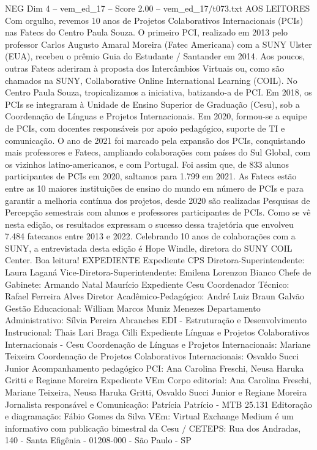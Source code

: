 \begin{textsample}{NEG Dim 4 – vem\_ed\_17 – Score 2.00 – vem\_ed\_17/t073.txt}  \label{ex:f4_neg_080}
AOS LEITORES Com orgulho, revemos 10 anos de Projetos Colaborativos Internacionais (PCIs) nas Fatecs do Centro Paula Souza.
O primeiro PCI, realizado em 2013 pelo professor Carlos Augusto Amaral Moreira (Fatec Americana) com a SUNY Ulster (EUA), recebeu o prêmio Guia do Estudante / Santander em 2014.
Aos poucos, outras Fatecs aderiram à proposta dos Intercâmbios Virtuais ou, como são chamados na SUNY, Collaborative Online International Learning (COIL).
No Centro Paula Souza, tropicalizamos a iniciativa, batizando-a de PCI.
Em 2018, os PCIs se integraram à Unidade de Ensino Superior de Graduação (Cesu), sob a Coordenação de Línguas e Projetos Internacionais.
Em 2020, formou-se a equipe de PCIs, com docentes responsáveis por apoio pedagógico, suporte de TI e comunicação.
O ano de 2021 foi marcado pela expansão dos PCIs, conquistando mais professores e Fatecs, ampliando colaborações com países do Sul Global, com os vizinhos latino-americanos, e com Portugal.
Foi assim que, de 833 alunos participantes de PCIs em 2020, saltamos para 1.799 em 2021.
As Fatecs estão entre as 10 maiores instituições de ensino do mundo em número de PCIs e para garantir a melhoria contínua dos projetos, desde 2020 são realizadas Pesquisas de Percepção semestrais com alunos e professores participantes de PCIs.
Como se vê nesta edição, os resultados expressam o sucesso dessa trajetória que envolveu 7.484 fatecanos entre 2013 e 2022.
Celebrando 10 anos de colaborações com a SUNY, a entrevistada desta edição é Hope Windle, diretora do SUNY COIL Center.
Boa leitura!
EXPEDIENTE Expediente CPS Diretora-Superintendente: Laura Laganá Vice-Diretora-Superintendente: Emilena Lorenzon Bianco Chefe de Gabinete: Armando Natal Maurício Expediente Cesu Coordenador Técnico: Rafael Ferreira Alves Diretor Acadêmico-Pedagógico: André Luiz Braun Galvão Gestão Educacional: William Marcos Muniz Menezes Departamento Administrativo: Sílvia Pereira Abranches EDI - Estruturação e Desenvolvimento Instrucional: Thais Lari Braga Cilli Expediente Línguas e Projetos Colaborativos Internacionais - Cesu Coordenação de Línguas e Projetos Internacionais: Mariane Teixeira Coordenação de Projetos Colaborativos Internacionais: Osvaldo Succi Junior Acompanhamento pedagógico PCI: Ana Carolina Freschi, Neusa Haruka Gritti e Regiane Moreira Expediente VEm Corpo editorial: Ana Carolina Freschi, Mariane Teixeira, Neusa Haruka Gritti, Osvaldo Succi Junior e Regiane Moreira Jornalista responsável e Comunicação: Patrícia Patrício - MTB 25.131 Editoração e diagramação: Fábio Gomes da Silva VEm: Virtual Exchange Medium é um informativo com publicação bimestral da Cesu / CETEPS: Rua dos Andradas, 140 - Santa Efigênia - 01208-000 - São Paulo - SP

\end{textsample}
